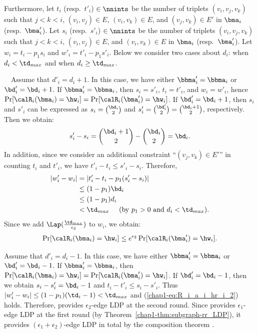 Furthermore, 
let $t_i$ (resp.~$t'_i$) $\in \nnints$ be the number of triplets $(v_i, v_j, v_k)$ such that $j < k < i$, $(v_i,v_j) \in E$, $(v_i,v_k) \in E$, and $(v_j,v_k) \in E'$ in $\bma_i$ (resp.~$\bma'_i$). 
Let $s_i$ (resp.~$s'_i$) $\in \nnints$ be the number of triplets $(v_i, v_j, v_k)$ such that $j < k < i$, $(v_i,v_j) \in E$, and $(v_i,v_k) \in E$ in $\bma_i$ (resp.~$\bma'_i$). 
Let $w_i = t_i - p_1 s_i$ and $w'_i = t'_i - p_1 s'_i$. 
Below we consider two cases about $d_i$: when $d_i < \td_{max}$ and when $d_i \geq \td_{max}$. 

\smallskip
{}~~Assume that $d'_i = d_i + 1$. 
In this case, we have either $\bbma'_i = \bbma_i$ or $\bd'_i = \bd_i+1$. 
If $\bbma'_i = \bbma_i$, then $s_i = s'_i$, $t_i = t'_i$, and $w_i = w'_i$, hence $\Pr[\calR_i(\bma_i) = \hw_i] = \Pr[\calR_i(\bma'_i) = \hw_i]$. 
If $\bd'_i = \bd_i+1$, then $s_i$ and $s'_i$ can be expressed as $s_i = \binom{\bd_i}{2}$ and $s'_i = \binom{\bd'_i}{2} = \binom{\bd_i+1}{2}$, respectively. 
Then we obtain:
\begin{align*}
s'_i - s_i = \binom{\bd_i+1}{2} - \binom{\bd_i}{2} = \bd_i.
\end{align*}
In addition, since we consider an additional constraint ``$(v_j,v_k) \in E'$'' in counting $t_i$ and $t'_i$, 
we have $t'_i - t_i \leq s'_i - s_i$. 
Therefore, 
\begin{align*}
|w'_i - w_i| 
&= |t'_i - t_i - p_1 (s'_i - s_i)| \\
&\leq (1 - p_1) \bd_i \\
&\leq (1 - p_1) d_i \\
&< \td_{max} \hspace{5mm} \text{(by $p_1 > 0$ and $d_i < \td_{max}$)}.
\end{align*}
Since we add $\Lap(\frac{\td_{max}}{\epsilon_2})$ to $w_i$, we obtain:
\begin{align}
\Pr[\calR_i(\bma_i) = \hw_i] \leq e^{\epsilon_2} \Pr[\calR_i(\bma'_i) = \hw_i]. 
\label{chap1-eq:R_i_a_i_hr_i_2}
\end{align}

Assume that $d'_i = d_i - 1$. 
In this case, we have either $\bbma'_i = \bbma_i$ or $\bd'_i = \bd_i-1$. 
If $\bbma'_i = \bbma_i$, then $\Pr[\calR_i(\bma_i) = \hw_i] = \Pr[\calR_i(\bma'_i) = \hw_i]$. 
If $\bd'_i = \bd_i-1$, then we obtain $s_i - s'_i = \bd_i - 1$ and $t_i - t'_i \leq s_i - s'_i$. 
Thus $|w'_i - w_i| \leq (1-p_1) (\td_i - 1) < \td_{max}$ and (\ref{chap1-eq:R_i_a_i_hr_i_2}) holds. 
Therefore,  provides $\epsilon_2$-edge LDP at the second round. 
Since  provides $\epsilon_1$-edge LDP at the first round (by Theorem~\ref{chap1-thm:subgraph-rr_LDP}), it provides $(\epsilon_1 + \epsilon_2)$-edge LDP in total by the composition theorem \cite{DP}. 

